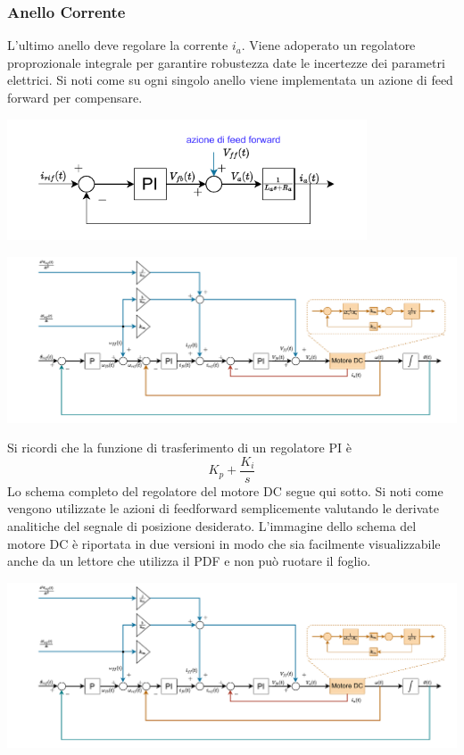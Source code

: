 \documentclass[10pt, letterpaper]{report}
\begin{document}
\subsubsection{Anello Corrente}
L'ultimo anello deve regolare la corrente $i_a$. Viene adoperato un regolatore proprozionale integrale per garantire robustezza date le incertezze dei parametri elettrici. Si noti come su ogni singolo anello viene implementata un azione di feed forward per compensare.\begin{center}
    \includegraphics[width=0.8\textwidth ]{images/anelloCorrente.pdf}
\end{center}\newpage
\begin{center}
    \includegraphics[width=1.5\textwidth,angle=90,origin=c ]{images/controlloMotoreDc.pdf}
\end{center}\newpage
Si ricordi che la funzione di trasferimento di un regolatore PI è $$ K_p+\frac{K_i}{s}$$
Lo schema completo del regolatore del motore DC segue qui sotto. Si noti come vengono utilizzate le azioni di feedforward semplicemente valutando le derivate analitiche del segnale di posizione desiderato. L'immagine dello schema del motore DC è riportata in due versioni in modo che sia facilmente visualizzabile anche da un lettore che utilizza il PDF e non può ruotare il foglio.
\begin{center}
    \includegraphics[width=1\textwidth]{images/controlloMotoreDc.pdf}
\end{center}
\end{document}
